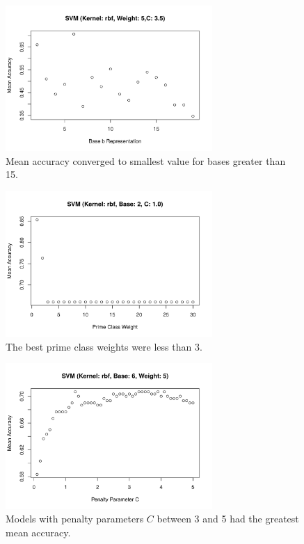 \documentclass[10pt, titlepage]{amsart}
\theoremstyle{definition}
\begin{document}
\begin{appendix}
	\begin{figure}[h!]
		\caption{Mean accuracy converged to smallest value for bases greater than 15.}
		\centering
			\includegraphics[width=0.7\textwidth]{base_demo}
	\end{figure}

	\begin{figure}[h!]
		\caption{The best prime class weights were less than 3.}
		\centering
			\includegraphics[width=0.7\textwidth]{weight_demo}
	\end{figure}
	
	\begin{figure}[h!]
		\caption{Models with penalty parameters $C$ between 3 and 5 had the greatest mean accuracy.}
		\centering
			\includegraphics[width=0.7\textwidth]{c_demo}
	\end{figure}	
	

\end{appendix}
\end{document}
